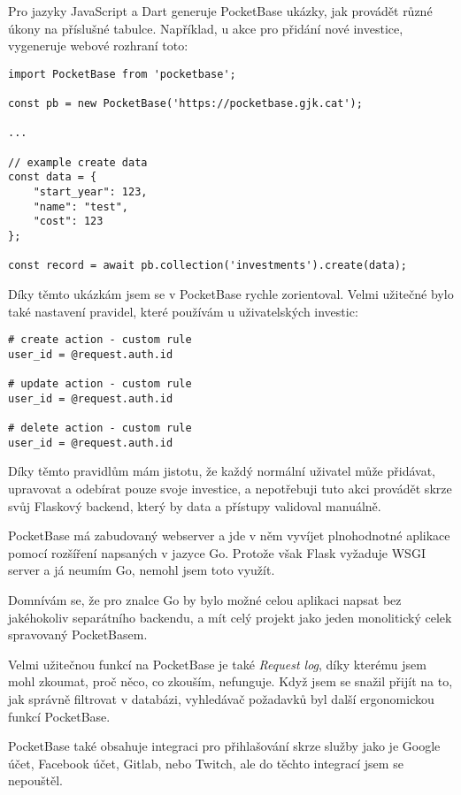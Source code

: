 \documentclass[11pt,a4paper,twoside,openright]{report}
\begin{document}
Pro jazyky JavaScript a Dart generuje PocketBase ukázky, jak provádět různé úkony na příslušné tabulce.
Například, u akce pro přidání nové investice, vygeneruje webové rozhraní toto:

\begin{verbatim}
import PocketBase from 'pocketbase';

const pb = new PocketBase('https://pocketbase.gjk.cat');

...

// example create data
const data = {
    "start_year": 123,
    "name": "test",
    "cost": 123
};

const record = await pb.collection('investments').create(data);
\end{verbatim}

Díky těmto ukázkám jsem se v PocketBase rychle zorientoval. Velmi užitečné bylo také nastavení pravidel,
které používám u uživatelských investic:

\begin{verbatim}
# create action - custom rule
user_id = @request.auth.id

# update action - custom rule
user_id = @request.auth.id

# delete action - custom rule
user_id = @request.auth.id
\end{verbatim}

Díky těmto pravidlům mám jistotu, že každý normální uživatel může přidávat, upravovat a odebírat pouze svoje
investice, a nepotřebuji tuto akci provádět skrze svůj Flaskový backend, který by data a přístupy validoval
manuálně.

PocketBase má zabudovaný webserver a jde v něm vyvíjet plnohodnotné aplikace pomocí rozšíření napsaných
v jazyce Go. Protože však Flask vyžaduje WSGI server a já neumím Go, nemohl jsem toto využít.

Domnívám se, že pro znalce Go by bylo možné celou aplikaci napsat bez jakéhokoliv separátního backendu,
a mít celý projekt jako jeden monolitický celek spravovaný PocketBasem.

Velmi užitečnou funkcí na PocketBase je také \emph{Request log}, díky kterému jsem mohl zkoumat, proč
něco, co zkouším, nefunguje. Když jsem se snažil přijít na to, jak správně filtrovat v databázi, vyhledávač
požadavků byl další ergonomickou funkcí PocketBase.

PocketBase také obsahuje integraci pro přihlašování skrze služby jako je Google účet, Facebook účet,
Gitlab, nebo Twitch, ale do těchto integrací jsem se nepouštěl.
\end{document}
